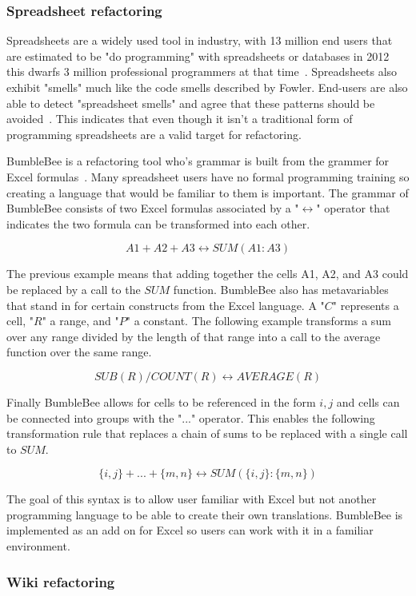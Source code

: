 \subsubsection{Spreadsheet refactoring}
Spreadsheets are a widely used tool in industry, with 13 million end users that are estimated to be "do programming" with spreadsheets or databases in 2012 this dwarfs 3 million professional programmers at that time~\citep{endUsers}. Spreadsheets also exhibit "smells" much like the code smells described by Fowler. End-users are also able to detect "spreadsheet smells" and agree that these patterns should be avoided~\citep{spreadsheetSmells}. This indicates that even though it isn't a traditional form of programming spreadsheets are a valid target for refactoring.

BumbleBee is a refactoring tool who's grammar is built from the grammer for Excel formulas~\citep{bumblebee}. Many spreadsheet users have no formal programming training so creating a language that would be familiar to them is important. The grammar of BumbleBee consists of two Excel formulas associated by a "$\leftrightarrow$" operator that indicates the two formula can be transformed into each other.

$$ A1+A2+A3 \leftrightarrow SUM(A1:A3) $$

The previous example means that adding together the cells A1, A2, and A3 could be replaced by a call to the $SUM$ function. BumbleBee also has metavariables that stand in for certain constructs from the Excel language. A "$C$" represents a cell, "$R$" a range, and "$P$" a constant. The following example transforms a sum over any range divided by the length of that range into a call to the average function over the same range.

$$ SUB(R)/COUNT(R) \leftrightarrow AVERAGE(R) $$

Finally BumbleBee allows for cells to be referenced in the form ${i,j}$ and cells can be connected into groups with the "$...$" operator. This enables the following transformation rule that replaces a chain of sums to be replaced with a single call to $SUM$.

$$ \{i,j\} + ... + \{m,n\} \leftrightarrow SUM(\{i,j\}:\{m,n\}) $$

The goal of this syntax is to allow user familiar with Excel but not another programming language to be able to create their own translations. BumbleBee is implemented as an add on for Excel so users can work with it in a familiar environment.

\subsubsection{Wiki refactoring}

